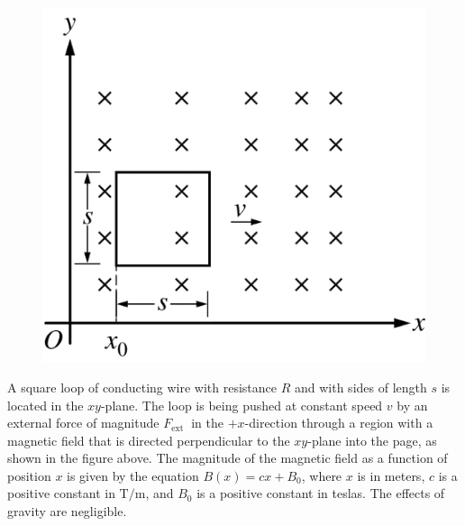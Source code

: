 %
\begin{figure}[H]
\centering
\includegraphics[scale=0.3]{images/img-021-029.png}
\end{figure}


\question
A square loop of conducting wire with resistance $R$ and with sides of length $s$ is located in the $x y$-plane. The loop is being pushed at constant speed $v$ by an external force of magnitude $F_{\text {ext }}$ in the $+x$-direction through a region with a magnetic field that is directed perpendicular to the $x y$-plane into the page, as shown in the figure above. The magnitude of the magnetic field as a function of position $x$ is given by the equation $B(x)=c x+B_{0}$, where $x$ is in meters, $c$ is a positive constant in $\mathrm{T} / \mathrm{m}$, and $B_{0}$ is a positive constant in teslas. The effects of gravity are negligible. %

